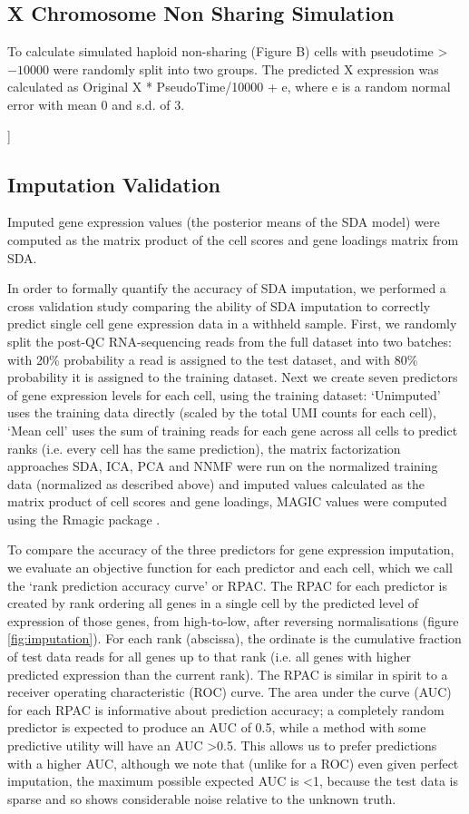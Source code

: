 \subsection{X Chromosome Non Sharing Simulation}
To calculate simulated haploid non-sharing (Figure \label{fig:MSCI}B) cells with pseudotime > $-10000$ were randomly split into two groups. The predicted X expression was calculated as Original X * PseudoTime/10000 + e, where e is a random normal error with mean 0 and s.d. of 3.

]\subsection{Imputation Validation}
Imputed gene expression values (the posterior means of the SDA model) were computed as the matrix product of the cell scores and gene loadings matrix from SDA.

In order to formally quantify the accuracy of SDA imputation, we performed a cross validation study comparing the ability of SDA imputation to correctly predict single cell gene expression data in a withheld sample. First, we randomly split the post-QC RNA-sequencing reads from the full dataset into two batches: with 20\% probability a read is assigned to the test dataset, and with 80\% probability it is assigned to the training dataset. Next we create seven predictors of gene expression levels for each cell, using the training dataset: ‘Unimputed’ uses the training data directly (scaled by the total UMI counts for each cell), ‘Mean cell’ uses the sum of training reads for each gene across all cells to predict ranks (i.e. every cell has the same prediction), the matrix factorization approaches SDA, ICA, PCA and NNMF were run on the normalized training data (normalized as described above) and imputed values calculated as the matrix product of cell scores and gene loadings, MAGIC values were computed using the Rmagic package \parencite{vanDijk2018Recovering}.

To compare the accuracy of the three predictors for gene expression imputation, we evaluate an objective function for each predictor and each cell, which we call the ‘rank prediction accuracy curve’ or RPAC. The RPAC for each predictor is created by rank ordering all genes in a single cell by the predicted level of expression of those genes, from high-to-low, after reversing normalisations (figure \ref{fig:imputation}). For each rank (abscissa), the ordinate is the cumulative fraction of test data reads for all genes up to that rank (i.e. all genes with higher predicted expression than the current rank). The RPAC is similar in spirit to a receiver operating characteristic (ROC) curve. The area under the curve (AUC) for each RPAC is informative about prediction accuracy; a completely random predictor is expected to produce an AUC of 0.5, while a method with some predictive utility will have an AUC >0.5. This allows us to prefer predictions with a higher AUC, although we note that (unlike for a ROC) even given perfect imputation, the maximum possible expected AUC is <1, because the test data is sparse and so shows considerable noise relative to the unknown truth.

